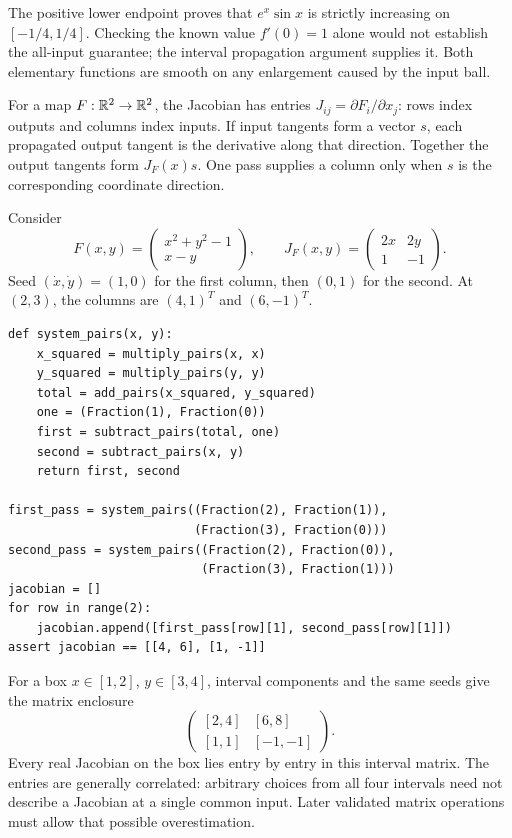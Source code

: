 The positive lower endpoint proves that $e^x\sin x$ is strictly increasing
on $[-1/4,1/4]$. Checking the known value $f'(0)=1$ alone would not establish
the all-input guarantee; the interval propagation argument supplies it.
Both elementary functions are smooth on any enlargement caused by the input ball.


\newpage
{}
For a map $F:\mathbb R^2\to\mathbb R^2$, the Jacobian has entries
$J_{ij}=\partial F_i/\partial x_j$: rows index outputs and columns index
inputs. If input tangents form a vector $s$, each propagated output tangent
is the derivative along that direction. Together the output tangents form
$J_F(x)s$. One pass supplies a column only when $s$ is the corresponding
coordinate direction.

Consider
\[
 F(x,y)=\begin{pmatrix}x^2+y^2-1\\x-y\end{pmatrix},\qquad
 J_F(x,y)=\begin{pmatrix}2x&2y\\1&-1\end{pmatrix}.
\]
Seed $(\dot x,\dot y)=(1,0)$ for the first column, then $(0,1)$ for the
second. At $(2,3)$, the columns are $(4,1)^T$ and $(6,-1)^T$.
\begin{lstlisting}
def system_pairs(x, y):
    x_squared = multiply_pairs(x, x)
    y_squared = multiply_pairs(y, y)
    total = add_pairs(x_squared, y_squared)
    one = (Fraction(1), Fraction(0))
    first = subtract_pairs(total, one)
    second = subtract_pairs(x, y)
    return first, second

first_pass = system_pairs((Fraction(2), Fraction(1)),
                          (Fraction(3), Fraction(0)))
second_pass = system_pairs((Fraction(2), Fraction(0)),
                           (Fraction(3), Fraction(1)))
jacobian = []
for row in range(2):
    jacobian.append([first_pass[row][1], second_pass[row][1]])
assert jacobian == [[4, 6], [1, -1]]
\end{lstlisting}

For a box $x\in[1,2]$, $y\in[3,4]$, interval components and the same seeds
give the matrix enclosure
\[
                 \begin{pmatrix}[2,4]&[6,8]\\{}[1,1]&[-1,-1]\end{pmatrix}.
\]
Every real Jacobian on the box lies entry by entry in this interval matrix.
The entries are generally correlated: arbitrary choices from all four
intervals need not describe a Jacobian at a single common input. Later
validated matrix operations must allow that possible overestimation.


